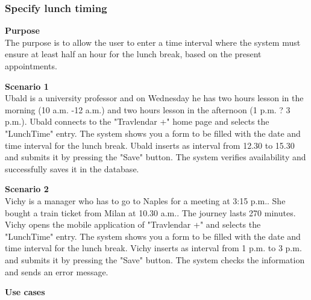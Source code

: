 \documentclass{article}
\begin{document}
	\subsubsection{Specify lunch timing}
	
	\bigskip
	\noindent
	\textbf{Purpose} \\
	The purpose is to allow the user to enter a time interval where the system must ensure at least half an hour for the lunch break, based on the present appointments.
	
	\bigskip
	\noindent
	\textbf{Scenario 1} \\
	Ubald is a university professor and on Wednesday he has two hours lesson in the morning (10 a.m. -12 a.m.) and two hours lesson in the afternoon (1 p.m. ? 3 p.m.). Ubald connects to the "Travlendar +" home page and selects the "LunchTime" entry. The system shows you a form to be filled with the date and time interval for the lunch break. Ubald inserts as interval from 12.30 to 15.30 and submits it by pressing the "Save" button. The system verifies availability and successfully saves it in the database.
	
	\bigskip
	\noindent
	\textbf{Scenario 2} \\
	Vichy is a manager who has to go to Naples for a meeting at 3:15 p.m.. She bought a train ticket from Milan at 10.30 a.m.. The journey lasts 270 minutes. Vichy opens the mobile application of "Travlendar +" and selects the "LunchTime" entry. The system shows you a form to be filled with the date and time interval for the lunch break. Vichy inserts as interval from 1 p.m. to 3 p.m. and submits it by pressing the "Save" button. The system checks the information and sends an error message.
	
	\bigskip
	\noindent
	\textbf{Use cases} \\
	
\end{document}
